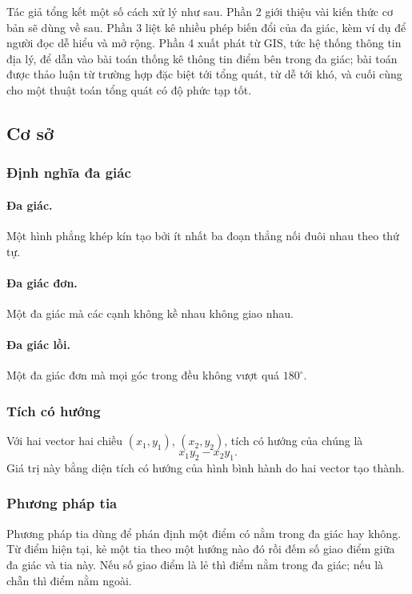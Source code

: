 \documentclass[11pt]{article}
\begin{document}
Tác giả tổng kết một số cách xử lý như sau. Phần 2 giới thiệu vài kiến thức cơ
bản sẽ dùng về sau. Phần 3 liệt kê nhiều phép biến đổi của đa giác, kèm ví dụ
để người đọc dễ hiểu và mở rộng. Phần 4 xuất phát từ GIS, tức hệ thống thông
tin địa lý, để dẫn vào bài toán thống kê thông tin điểm bên trong đa giác; bài
toán được thảo luận từ trường hợp đặc biệt tới tổng quát, từ dễ tới khó, và cuối
cùng cho một thuật toán tổng quát có độ phức tạp tốt.

\subsection{Cơ sở}

\subsubsection{Định nghĩa đa giác}

\paragraph{Đa giác.}
Một hình phẳng khép kín tạo bởi ít nhất ba đoạn thẳng nối đuôi nhau theo thứ
tự.

\paragraph{Đa giác đơn.}
Một đa giác mà các cạnh không kề nhau không giao nhau.

\paragraph{Đa giác lồi.}
Một đa giác đơn mà mọi góc trong đều không vượt quá \(180^\circ\).

\subsubsection{Tích có hướng}

Với hai vector hai chiều \((x_1,y_1)\), \((x_2,y_2)\), tích có hướng của chúng
là
\[
  x_1y_2-x_2y_1.
\]
Giá trị này bằng diện tích có hướng của hình bình hành do hai vector tạo thành.

\subsubsection{Phương pháp tia}

Phương pháp tia dùng để phán định một điểm có nằm trong đa giác hay không. Từ
điểm hiện tại, kẻ một tia theo một hướng nào đó rồi đếm số giao điểm giữa đa
giác và tia này. Nếu số giao điểm là lẻ thì điểm nằm trong đa giác; nếu là chẵn
thì điểm nằm ngoài.
\end{document}
